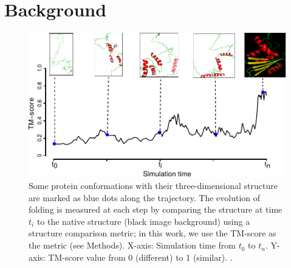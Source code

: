 \documentclass[twocolumn]{bmcart}%
\begin{document}


\section*{Background}


\begin{figure}[th]
\includegraphics[viewport=0bp 0bp 224bp 125bp]{images/01-trajectory-description-2RN2-pdbs}

\caption{ Some protein conformations with their three-dimensional structure are marked as blue dots along the trajectory. The evolution of folding is measured at each step by comparing the structure at time $t_{i}$ to the native structure (black image background) using a structure comparison metric; in this work, we use the TM-score as the metric (see Methods). X-axis: Simulation time from $t_{0}$ to $t_{n}$. Y-axis: TM-score value from 0 (different) to 1 (similar). \label{fig:Folding-Trajectory}. }
\end{figure}
\end{document}
